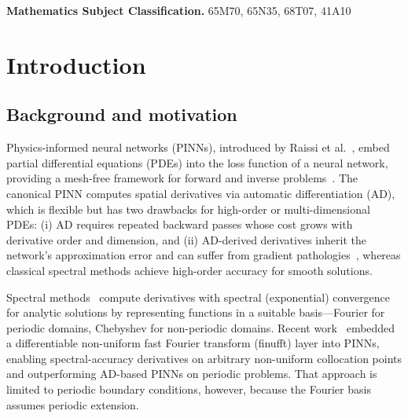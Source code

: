 \documentclass[sn-mathphys,Numbered]{sn-jnl}
\theoremstyle{thmstyleone}
\theoremstyle{thmstyletwo}
\theoremstyle{thmstylethree}
\begin{document}

\maketitle

{\footnotesize\noindent\textbf{Mathematics Subject Classification.} 65M70, 65N35, 68T07, 41A10\par}


\section{Introduction}\label{sec:intro}

\subsection{Background and motivation}
Physics-informed neural networks (PINNs), introduced by Raissi et al.~\cite{raissi2019physics}, embed partial differential equations (PDEs) into the loss function of a neural network, providing a mesh-free framework for forward and inverse problems~\cite{karniadakis2021physics}. The canonical PINN computes spatial derivatives via automatic differentiation (AD), which is flexible but has two drawbacks for high-order or multi-dimensional PDEs: (i) AD requires repeated backward passes whose cost grows with derivative order and dimension, and (ii) AD-derived derivatives inherit the network's approximation error and can suffer from gradient pathologies~\cite{wang2021understanding}, whereas classical spectral methods achieve high-order accuracy for smooth solutions.

Spectral methods~\cite{trefethen2000spectral,boyd2001chebyshev,canuto2006spectral} compute derivatives with spectral (exponential) convergence for analytic solutions by representing functions in a suitable basis---Fourier for periodic domains, Chebyshev for non-periodic domains. Recent work~\cite{wang2026differentiable} embedded a differentiable non-uniform fast Fourier transform (finufft) layer into PINNs, enabling spectral-accuracy derivatives on arbitrary non-uniform collocation points and outperforming AD-based PINNs on periodic problems. That approach is limited to periodic boundary conditions, however, because the Fourier basis assumes periodic extension.
\end{document}

